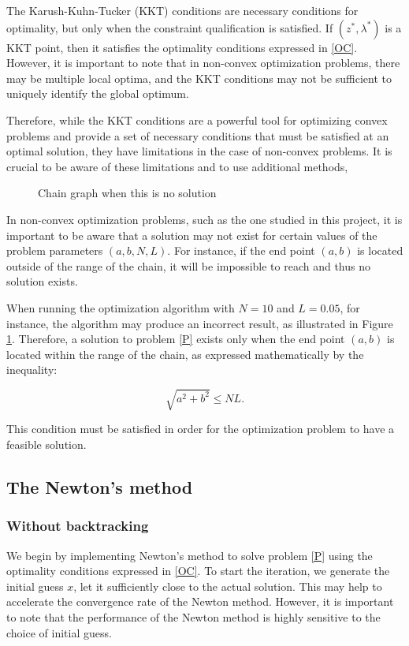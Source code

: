 \documentclass[10pt,a4paper,notitlepage,twocolumn]{article}
\begin{document}
The Karush-Kuhn-Tucker (KKT) conditions are necessary conditions for optimality, but only when the constraint qualification is satisfied. If $(z^*, \lambda^*)$ is a KKT point, then it satisfies the optimality conditions expressed in \eqref{OC}. However, it is important to note that in non-convex optimization problems, there may be multiple local optima, and the KKT conditions may not be sufficient to uniquely identify the global optimum.

Therefore, while the KKT conditions are a powerful tool for optimizing convex problems and provide a set of necessary conditions that must be satisfied at an optimal solution, they have limitations in the case of non-convex problems. It is crucial to be aware of these limitations and to use additional methods,

\begin{figure}[H]    
    \centering
    
    \caption{Chain graph when this is no solution}
    \label{nosolution}
\end{figure}

In non-convex optimization problems, such as the one studied in this project, it is important to be aware that a solution may not exist for certain values of the problem parameters $(a,b,N,L)$. For instance, if the end point $(a,b)$ is located outside of the range of the chain, it will be impossible to reach and thus no solution exists.

When running the optimization algorithm with $N=10$ and $L=0.05$, for instance, the algorithm may produce an incorrect result, as illustrated in Figure \ref{nosolution}. Therefore, a solution to problem \eqref{P} exists only when the end point $(a,b)$ is located within the range of the chain, as expressed mathematically by the inequality:

\begin{equation}
\sqrt{a^2 + b^2} \leq NL.
\end{equation}

This condition must be satisfied in order for the optimization problem to have a feasible solution.

\subsection{The Newton's method}
\subsubsection{Without backtracking}
We begin by implementing Newton's method to solve problem \eqref{P} using the optimality conditions expressed in \autoref{OC}. To start the iteration, we generate the initial guess $x$, let it sufficiently close to the actual solution. This may help to accelerate the convergence rate of the Newton method. However, it is important to note that the performance of the Newton method is highly sensitive to the choice of initial guess. 
\end{document}
